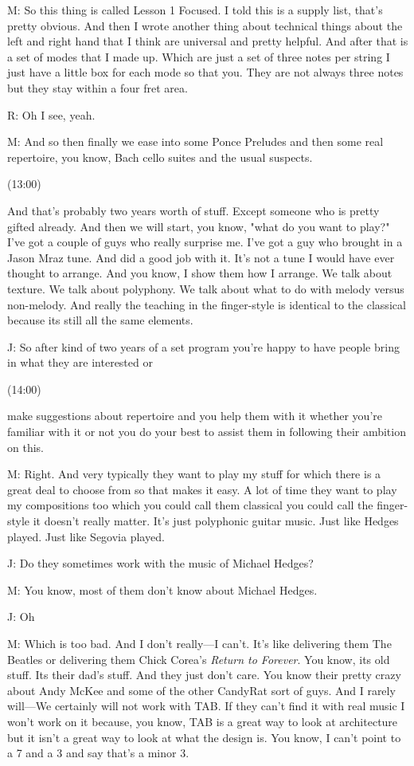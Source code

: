 \documentclass[11pt]{article}
\begin{document}
M: So this thing is called Lesson 1 Focused. I told this is a supply list, that's pretty obvious. And then I wrote another thing about technical things about the left and right hand that I think are universal and pretty helpful. And after that is a set of modes that I made up. Which are just a set of three notes per string I just have a little box for each mode so that you. They are not always three notes but they stay within a four fret area. 

R: Oh I see, yeah. 

M: And so then finally we ease into some Ponce Preludes and then some real repertoire, you know, Bach cello suites and the usual suspects. 

(13:00)

And that's probably two years worth of stuff. Except someone who is pretty gifted already. And then we will start, you know, "what do you want to play?" I've got a couple of guys who really surprise me. I've got a guy who brought in a Jason Mraz tune. And did a good job with it. It's not a tune I would  have ever thought to arrange. And you know, I show them how I arrange. We talk about texture. We talk about polyphony. We talk about what to do with melody versus non-melody. And really the teaching in the finger-style is identical to the classical because its still all the same elements.

J: So after kind of two years of a set program you're happy to have people bring in what they are interested or 

(14:00)

make suggestions about repertoire and you help them with it whether you're familiar with it or not you do your best to assist them in following their ambition on this.

M: Right. And very typically they want to play my stuff for which there is a great deal to choose from so that makes it easy. A lot of time they want to play my compositions too which you could call them classical you could call the finger-style it doesn't really matter. It's just polyphonic guitar music. Just like Hedges played. Just like Segovia played. 

J: Do they sometimes work with the music of Michael Hedges?

M: You know, most of them don't know about Michael Hedges.

J: Oh

M: Which is too bad. And I don't really---I can't. It's like delivering them The Beatles or delivering them Chick Corea's \emph{Return to Forever}. You know, its old stuff. Its their dad's stuff. And they just don't care. You know their pretty crazy about Andy McKee and some of the other CandyRat sort of guys. And I rarely will---We certainly will not work with TAB. If they can't find it with real music I won't work on it because, you know, TAB is a great way to look at architecture but it isn't a great way to look at what the design is. You know, I can't point to a 7 and a 3 and say that's a minor 3. 
\end{document}
